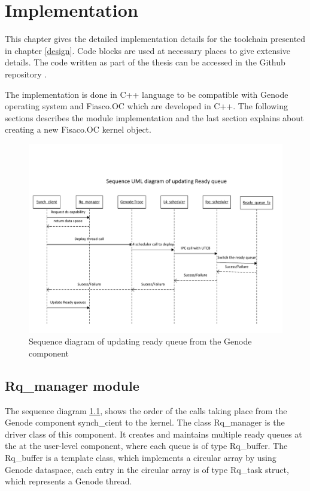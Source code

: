 \chapter{Implementation}

This chapter gives the detailed implementation details for the toolchain presented in chapter \ref{design}. Code blocks are used at necessary places to give extensive details. The code written as part of the thesis can be accessed in the Github repository \cite{git_synccode}.

The implementation is done in C++ language to be compatible with Genode operating system and Fiasco.OC which are developed in C++. The following sections describes the module implementation and the last section explains about creating a new Fisaco.OC kernel object. 

\begin{figure}[h]
\centering
\includegraphics[width=1.0\linewidth]{figures/sequence_classUpdate}
\caption{Sequence diagram of updating ready queue from the Genode component}
\label{fig:sequence_classUpdate}
\end{figure}


\section{Rq\_manager module}

The sequence diagram \ref{fig:sequence_classUpdate}, shows the order of the calls taking place from the Genode component synch\_cient to the kernel. The class Rq\_manager is the driver class of this component. It creates and maintains multiple ready queues at the at the user-level component, where each queue is of type Rq\_buffer. The Rq\_buffer is a template class, which implements a circular array by using Genode dataspace, each entry in the circular array is of type Rq\_task struct, which represents a Genode thread.


